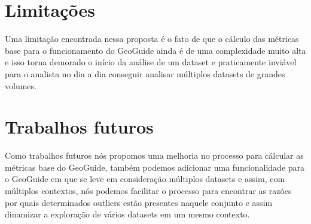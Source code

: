 \section{Limitações}

Uma limitação encontrada nessa proposta é o fato de que o cálculo das métricas base para o funcionamento do GeoGuide ainda é de uma complexidade muito alta e isso torna demorado o início da análise de um dataset e praticamente inviável para o analista no dia a dia conseguir analisar múltiplos datasets de grandes volumes.

\section{Trabalhos futuros}

Como trabalhos futuros nós propomos uma melhoria no processo para cálcular as métricas base do GeoGuide, também podemos adicionar uma funcionalidade para o GeoGuide em que se leve em consideração múltiplos datasets e assim, com múltiplos contextos, nós podemos facilitar o processo para encontrar as razões por quais determinados outliers estão presentes naquele conjunto e assim dinamizar a exploração de vários datasets em um mesmo contexto. 